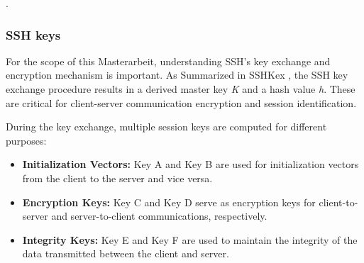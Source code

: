      \cite{RFC4251}.

    \subsubsection{SSH keys}
    For the scope of this Masterarbeit, understanding SSH's key exchange and encryption mechanism is important. As Summarized in SSHKex \cite{SSHkex22}, the SSH key exchange procedure results in a derived master key \textit{K} and a hash value \textit{h}. These are critical for client-server communication encryption and session identification.

    During the key exchange, multiple session keys are computed for different purposes:

    \begin{itemize}
        \item \textbf{Initialization Vectors:} Key A and Key B are used for initialization vectors from the client to the server and vice versa.
        \item \textbf{Encryption Keys:} Key C and Key D serve as encryption keys for client-to-server and server-to-client communications, respectively.
        \item \textbf{Integrity Keys:} Key E and Key F are used to maintain the integrity of the data transmitted between the client and server.
    \end{itemize}

